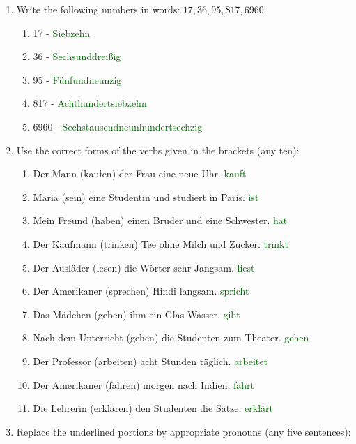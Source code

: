 \documentclass{article}
\begin{document}
\begin{enumerate}
    \item Write the following numbers in words:
    \(17,36,95,817,6960\)
    \begin{enumerate}
        \item 17 - \textcolor{darkgreen}{Siebzehn}
        \item 36 - \textcolor{darkgreen}{Sechsunddreißig}
        \item 95 - \textcolor{darkgreen}{Fünfundneunzig}
        \item 817 - \textcolor{darkgreen}{Achthundertsiebzehn}
        \item 6960 - \textcolor{darkgreen}{Sechstausendneunhundertsechzig}
    \end{enumerate}

    \item Use the correct forms of the verbs given in the brackets (any ten):
    \begin{enumerate}
        \item Der Mann (kaufen) der Frau eine neue Uhr. \textcolor{darkgreen}{kauft}
        \item Maria (sein) eine Studentin und studiert in Paris. \textcolor{darkgreen}{ist}
        \item Mein Freund (haben) einen Bruder und eine Schwester. \textcolor{darkgreen}{hat}
        \item Der Kaufmann (trinken) Tee ohne Milch und Zucker. \textcolor{darkgreen}{trinkt}
        \item Der Ausläder (lesen) die Wörter sehr Jangsam. \textcolor{darkgreen}{liest}
        \item Der Amerikaner (sprechen) Hindi langsam. \textcolor{darkgreen}{spricht}
        \item Das Mädchen (geben) ihm ein Glas Wasser. \textcolor{darkgreen}{gibt}
        \item Nach dem Unterricht (gehen) die Studenten zum Theater. \textcolor{darkgreen}{gehen}
        \item Der Professor (arbeiten) acht Stunden täglich. \textcolor{darkgreen}{arbeitet}
        \item Der Amerikaner (fahren) morgen nach Indien. \textcolor{darkgreen}{fährt}
        \item Die Lehrerin (erklären) den Studenten die Sätze. \textcolor{darkgreen}{erklärt}
    \end{enumerate}
    \item Replace the underlined portions by appropriate pronouns (any five sentences):
    \begin{enumerate}

\end{enumerate}
\end{enumerate}
\end{document}
